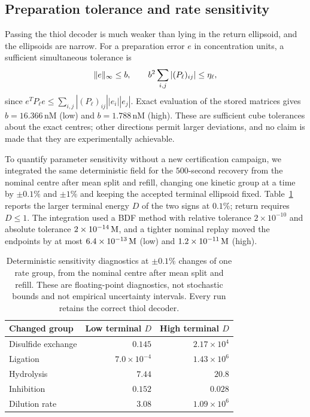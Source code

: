 \subsection{Preparation tolerance and rate sensitivity}\label{sec:sensitivity}
Passing the thiol decoder is much weaker than lying in the return ellipsoid, and the ellipsoids are narrow. For a preparation error $e$ in concentration units, a sufficient simultaneous tolerance is
\begin{equation}\label{eq:cube}
 \lVert e\rVert_\infty\le b,\qquad b^2\sum_{i,j}|(P_\ell)_{ij}|\le\eta_\ell,
\end{equation}
since $e^TP_\ell e\le\sum_{i,j}|(P_\ell)_{ij}||e_i||e_j|$. Exact evaluation of the stored matrices gives $b=16.366$\,nM (low) and $b=1.788$\,nM (high). These are sufficient cube tolerances about the exact centres; other directions permit larger deviations, and no claim is made that they are experimentally achievable.

To quantify parameter sensitivity without a new certification campaign, we integrated the same deterministic field for the $500$-second recovery from the nominal centre after mean split and refill, changing one kinetic group at a time by $\pm0.1\%$ and $\pm1\%$ and keeping the accepted terminal ellipsoid fixed. Table~\ref{tab:sensitivity} reports the larger terminal energy $D$ of the two signs at $0.1\%$; return requires $D\le1$. The integration used a BDF method with relative tolerance $2\times10^{-10}$ and absolute tolerance $2\times10^{-14}\,\mathrm{M}$, and a tighter nominal replay moved the endpoints by at most $6.4\times10^{-13}\,\mathrm{M}$ (low) and $1.2\times10^{-11}\,\mathrm{M}$ (high).

\begin{table}[t]
\centering
\caption{Deterministic sensitivity diagnostics at $\pm0.1\%$ changes of one rate group, from the nominal centre after mean split and refill. These are floating-point diagnostics, not stochastic bounds and not empirical uncertainty intervals. Every run retains the correct thiol decoder.}\label{tab:sensitivity}
\begin{tabular}{@{}lrr@{}}\toprule
Changed group & Low terminal $D$ & High terminal $D$\\\midrule
Disulfide exchange & $0.145$ & $2.17\times10^{4}$\\
Ligation & $7.0\times10^{-4}$ & $1.43\times10^{6}$\\
Hydrolysis & $7.44$ & $20.8$\\
Inhibition & $0.152$ & $0.028$\\
Dilution rate & $3.08$ & $1.09\times10^{6}$\\\bottomrule
\end{tabular}
\end{table}

